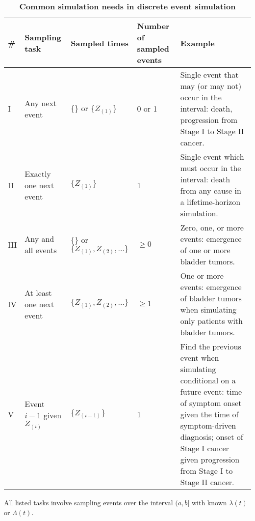 \begin{table}[ht!]
    \caption{\textbf{Common simulation needs in discrete event simulation}}\label{tab:simtasks} 
    \vspace{5pt}
    \centering
    \begin{tabular}{lp{2cm}lp{1.8cm}p{6cm}}
    \toprule
    \textbf{\#} & \textbf{Sampling task} & \textbf{Sampled times} & \textbf{Number of sampled events} & \textbf{Example}  \\ 
    \midrule
    I & Any next event&  $\{\}$  or $\{Z_{(1)}\}$&  0 or 1& Single event that may (or may not) occur in the interval: death, progression from Stage I to Stage II cancer. \\ 
    \addlinespace
    II & Exactly one next event&  $\{Z_{(1)} \}$&  1& Single event which must occur in the interval: death from any cause in a lifetime-horizon simulation. \\ 
    \addlinespace
    III & Any and all events&  $\{\}$ or $\{Z_{(1)}, Z_{(2)}, \dots \}$&  $\ge 0$& Zero, one, or more events: emergence of one or more bladder tumors. \\ 
    \addlinespace
    IV & At least one next event&  $\{Z_{(1)} , Z_{(2)}, \dots \}$&  $\ge 1$& One or more events: emergence of bladder tumors when simulating only patients with bladder tumors. \\ 
    \addlinespace
    V & Event $i-1$ given $Z_{(i)}$ & $\{Z_{(i-1)}\}$ & 1 & Find the previous event when simulating conditional on a future event: time of symptom onset given the time of symptom-driven diagnosis; onset of Stage I cancer given progression from Stage I to Stage II cancer. \\ 
    \bottomrule
    \end{tabular}
    \begin{flushleft}
    All listed tasks involve sampling events over the interval $(a, b]$ with known $\lambda(t)$ or $\Lambda(t)$.
    \end{flushleft}
\end{table}
